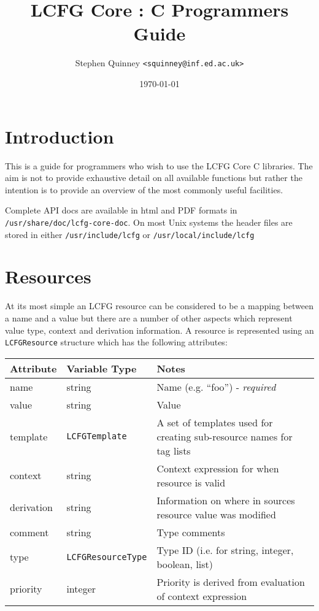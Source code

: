 \documentclass[11pt,a4paper,titlepage]{article}
\title{LCFG Core : C Programmers Guide}
\author{Stephen Quinney \texttt{<squinney@inf.ed.ac.uk>}}
\date{\today}
\begin{document}
\maketitle

\tableofcontents
\clearpage

\section{Introduction}

This is a guide for programmers who wish to use the LCFG Core C
libraries. The aim is not to provide exhaustive detail on all available
functions but rather the intention is to provide an overview of the
most commonly useful facilities. 

Complete API docs are available in html and PDF formats in
\texttt{/usr/share/doc/lcfg-core-doc}. On most Unix systems the header
files are stored in either \texttt{/usr/include/lcfg} or
\texttt{/usr/local/include/lcfg}

\section{Resources}

At its most simple an LCFG resource can be considered to be a mapping
between a name and a value but there are a number of other aspects
which represent value type, context and derivation information. A
resource is represented using an \texttt{LCFGResource} structure which
has the following attributes:

\begin{center}
  \begin{tabular}{| l l p{7cm}|}
\hline
Attribute  & Variable Type & Notes \\ 
\hline
name       & string & Name (e.g. ``foo'') - \textit{required}\\
value      & string & Value \\
template   & \texttt{LCFGTemplate} & A set of templates used for creating sub-resource names for tag lists \\
context    & string & Context expression for when resource is valid \\
derivation & string & Information on where in sources resource value was modified \\
comment    & string & Type comments \\
type       & \texttt{LCFGResourceType} & Type ID (i.e. for string, integer, boolean, list) \\
priority   & integer & Priority is derived from evaluation of context expression \\
\hline
\end{tabular}
\end{center}
\end{document}
